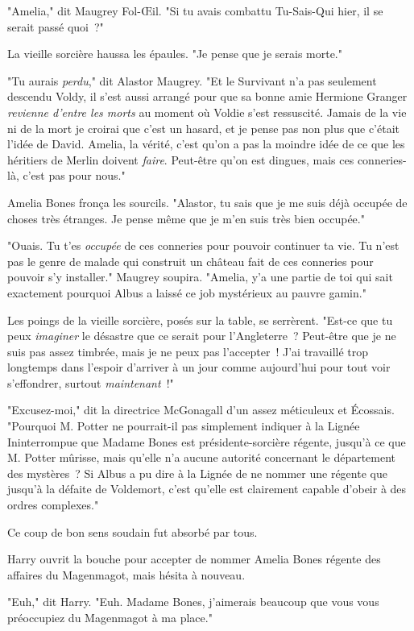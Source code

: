 "Amelia," dit Maugrey Fol-Œil. "Si tu avais combattu Tu-Sais-Qui hier, il se serait passé quoi~?"

La vieille sorcière haussa les épaules. "Je pense que je serais morte."

"Tu aurais \emph{perdu}," dit Alastor Maugrey. "Et le Survivant n'a pas seulement descendu Voldy, il s'est aussi arrangé pour que sa bonne amie Hermione Granger \emph{revienne d'entre les morts} au moment où Voldie s'est ressuscité. Jamais de la vie ni de la mort je croirai que c'est un hasard, et je pense pas non plus que c'était l'idée de David. Amelia, la vérité, c'est qu'on a pas la moindre idée de ce que les héritiers de Merlin doivent \emph{faire}. Peut-être qu'on est dingues, mais ces conneries-là, c'est pas pour nous."

Amelia Bones fronça les sourcils. "Alastor, tu sais que je me suis déjà occupée de choses très étranges. Je pense même que je m'en suis très bien occupée."

"Ouais. Tu t'es \emph{occupée} de ces conneries pour pouvoir continuer ta vie. Tu n'est pas le genre de malade qui construit un château fait de ces conneries pour pouvoir s'y installer." Maugrey soupira. "Amelia, y'a une partie de toi qui sait exactement pourquoi Albus a laissé ce job mystérieux au pauvre gamin."

Les poings de la vieille sorcière, posés sur la table, se serrèrent. "Est-ce que tu peux \emph{imaginer} le désastre que ce serait pour l'Angleterre~? Peut-être que je ne suis pas assez timbrée, mais je ne peux pas l'accepter~! J'ai travaillé trop longtemps dans l'espoir d'arriver à un jour comme aujourd'hui pour tout voir s'effondrer, surtout \emph{maintenant}~!"

"Excusez-moi," dit la directrice McGonagall d'un assez méticuleux et Écossais. "Pourquoi M. Potter ne pourrait-il pas simplement indiquer à la Lignée Ininterrompue que Madame Bones est présidente-sorcière régente, jusqu'à ce que M. Potter mûrisse, mais qu'elle n'a aucune autorité concernant le département des mystères~? Si Albus a pu dire à la Lignée de ne nommer une régente que jusqu'à la défaite de Voldemort, c'est qu'elle est clairement capable d'obeir à des ordres complexes."

Ce coup de bon sens soudain fut absorbé par tous.

Harry ouvrit la bouche pour accepter de nommer Amelia Bones régente des affaires du Magenmagot, mais hésita à nouveau.

"Euh," dit Harry. "Euh. Madame Bones, j'aimerais beaucoup que vous vous préoccupiez du Magenmagot à ma place."

